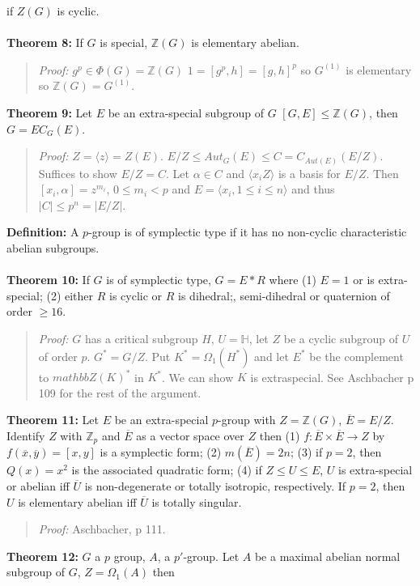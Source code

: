 if $Z(G)$ is cyclic.
\\
\\
{\bf Theorem 8:}
If $G$ is special, ${\mathbb Z}(G)$ is elementary abelian.
\begin{quote}
\emph{Proof:}
$g^p \in \Phi(G)= {\mathbb Z}(G)$ $1= [g^p,h]= [g,h]^p$ so $G^{(1)}$ is elementary
so ${\mathbb Z}(G)= G^{(1)}$.
\end{quote}
{\bf Theorem 9:}
Let $E$ be an extra-special subgroup of $G$ $[G, E] \le {\mathbb Z}(G)$, then
$G=E C_G(E)$.
\begin{quote}
\emph{Proof:}  
$Z=\langle z \rangle= Z(E)$.  $E/Z \leq Aut_G(E) \leq C= C_{Aut(E)}(E/Z)$.  Suffices to show
$E/Z=C$.  Let $\alpha \in C$ and $\langle x_iZ \rangle$ is a basis for $E/Z$.  Then $[x_i , \alpha ]= z^{m_i}$,
$0 \leq m_i <p$ and $E= \langle x_i, 1 \leq i \leq n \rangle$ and thus $|C| \leq p^n =|E/Z|$.
\end{quote}
{\bf Definition:}
A $p$-group is of symplectic type if it has no non-cyclic characteristic abelian subgroups.
\\
\\
{\bf Theorem 10:}
If $G$ is of symplectic type, $G= E*R$ where (1) $E=1$ or is extra-special;
(2) either $R$ is cyclic or $R$ is dihedral;, semi-dihedral or quaternion of order
$\ge 16$.
\begin{quote}
\emph{Proof:}  
$G$ has a critical subgroup $H$, $U= {\mathbb H}$, let $Z$ be a cyclic subgroup of $U$ of order $p$.
$G^*= G/Z$.  Put $K^* = \Omega_1(H^*)$ and let $E^*$ be the complement to ${mathbb Z}(K)^*$ in $K^*$.
We can show $K$ is extraspecial.  See Aschbacher p 109 for the rest of the argument.
\end{quote}
{\bf Theorem 11:}
Let $E$ be an extra-special $p$-group with $Z={\mathbb Z}(G)$, ${\overline E}= E/Z$.  Identify
$Z$ with ${\mathbb Z}_p$ and ${\overline E}$ as a vector space over $Z$ then
(1) $f: {\overline E} \times {\overline E} \rightarrow Z$
by $f({\overline x}, {\overline y}) = [x, y]$ is a symplectic form;
(2) $m({\overline E})= 2n$;
(3) if $p=2$, then $Q(x)= x^2$ is the associated quadratic form;
(4) if $Z \le U \le E$,  $U$ is extra-special or abelian iff ${\overline U}$ is
non-degenerate or totally isotropic, respectively.  If $p=2$, then $U$ is elementary abelian
iff ${\overline U}$ is totally singular.
\begin{quote}
\emph{Proof:}  
Aschbacher, p 111.
\end{quote}
{\bf Theorem 12:}
$G$ a $p$ group, $A$, a $p'$-group.
Let $A$ be a maximal abelian normal subgroup of $G$, $Z= \Omega_1(A)$ then
